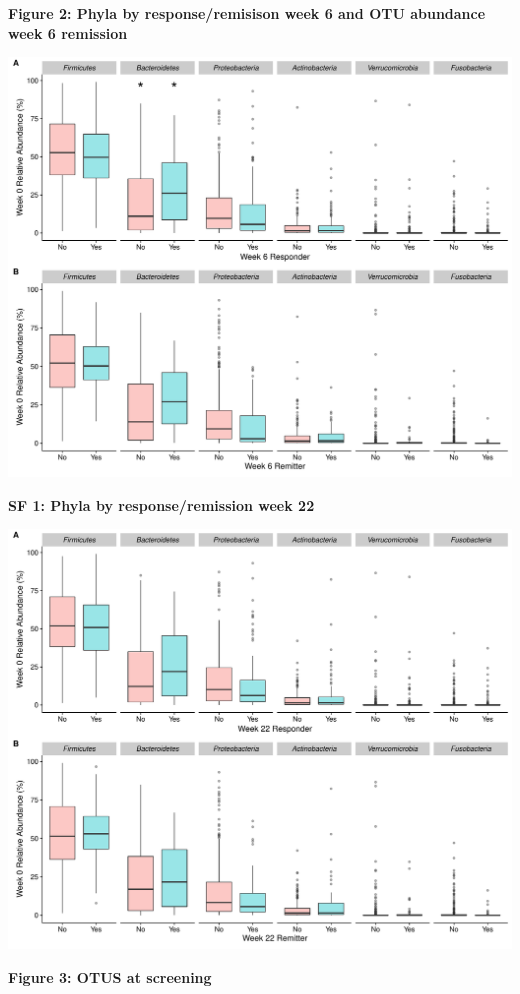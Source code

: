\documentclass[11pt,]{article}
\begin{document}
\newpage

\textbf{Figure 2: Phyla by response/remisison week 6 and OTU abundance
week 6 remission}

\includegraphics{figures/Figure2_wk6phyla.pdf}

\newpage

\textbf{SF 1: Phyla by response/remission week 22}

\includegraphics{figures/SF1_phylaWK22.pdf}

\newpage

\textbf{Figure 3: OTUS at screening}
\end{document}
